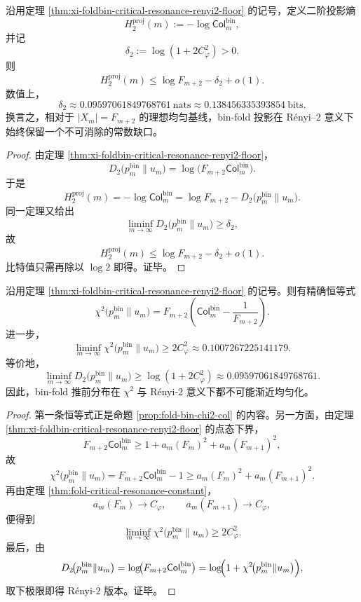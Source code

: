 \begin{theorem}\label{thm:xi-foldbin-renyi2-projection-entropy-constant-gap}
沿用定理 \ref{thm:xi-foldbin-critical-resonance-renyi2-floor} 的记号，定义二阶投影熵
\[
H_2^{\mathrm{proj}}(m):=-\log \mathsf{Col}^{\mathrm{bin}}_m,
\]
并记
\[
\delta_2:=\log(1+2C_\varphi^2)>0.
\]
则
\[
H_2^{\mathrm{proj}}(m)
\le
\log F_{m+2}-\delta_2+o(1).
\]
数值上，
\[
\delta_2\approx 0.09597061849768761\ \text{nats}
\approx 0.138456335393854\ \text{bits}.
\]
换言之，相对于 \(|X_m|=F_{m+2}\) 的理想均匀基线，bin-fold 投影在 Rényi--\(2\) 意义下始终保留一个不可消除的常数缺口。
\end{theorem}
\begin{proof}
由定理 \ref{thm:xi-foldbin-critical-resonance-renyi2-floor}，
\[
D_2\!\bigl(p_m^{\mathrm{bin}}\|u_m\bigr)
=
\log\!\bigl(F_{m+2}\mathsf{Col}^{\mathrm{bin}}_m\bigr).
\]
于是
\[
H_2^{\mathrm{proj}}(m)
=-\log \mathsf{Col}^{\mathrm{bin}}_m
=
\log F_{m+2}
-D_2\!\bigl(p_m^{\mathrm{bin}}\|u_m\bigr).
\]
同一定理又给出
\[
\liminf_{m\to\infty}D_2\!\bigl(p_m^{\mathrm{bin}}\|u_m\bigr)\ge \delta_2,
\]
故
\[
H_2^{\mathrm{proj}}(m)\le \log F_{m+2}-\delta_2+o(1).
\]
比特值只需再除以 \(\log 2\) 即得。证毕。
\end{proof}

\begin{theorem}\label{thm:xi-foldbin-critical-resonance-chi2-renyi2-separation}
沿用定理 \ref{thm:xi-foldbin-critical-resonance-renyi2-floor} 的记号。则有精确恒等式
\[
\boxed{\;
\chi^2\!\bigl(p_m^{\mathrm{bin}}\|u_m\bigr)
=
F_{m+2}\left(\mathsf{Col}^{\mathrm{bin}}_m-\frac{1}{F_{m+2}}\right).\;}
\]
进一步，
\[
\boxed{\;
\liminf_{m\to\infty}\chi^2\!\bigl(p_m^{\mathrm{bin}}\|u_m\bigr)
\ge
2C_\varphi^2
\approx 0.1007267225141179.\;}
\]
等价地，
\[
\boxed{\;
\liminf_{m\to\infty}D_2\!\bigl(p_m^{\mathrm{bin}}\|u_m\bigr)
\ge
\log(1+2C_\varphi^2)
\approx 0.09597061849768761.\;}
\]
因此，bin-fold 推前分布在 \(\chi^2\) 与 Rényi-\(2\) 意义下都不可能渐近均匀化。
\end{theorem}
\begin{proof}
第一条恒等式正是命题 \ref{prop:fold-bin-chi2-col} 的内容。另一方面，由定理 \ref{thm:xi-foldbin-critical-resonance-renyi2-floor} 的点态下界，
\[
F_{m+2}\mathsf{Col}^{\mathrm{bin}}_m
\ge
1+a_m(F_m)^2+a_m(F_{m+1})^2,
\]
故
\[
\chi^2\!\bigl(p_m^{\mathrm{bin}}\|u_m\bigr)
=
F_{m+2}\mathsf{Col}^{\mathrm{bin}}_m-1
\ge
a_m(F_m)^2+a_m(F_{m+1})^2.
\]
再由定理 \ref{thm:fold-critical-resonance-constant}，
\[
a_m(F_m)\to C_\varphi,
\qquad
a_m(F_{m+1})\to C_\varphi,
\]
便得到
\[
\liminf_{m\to\infty}\chi^2\!\bigl(p_m^{\mathrm{bin}}\|u_m\bigr)\ge 2C_\varphi^2.
\]
最后，由
\[
D_2\!\bigl(p_m^{\mathrm{bin}}\|u_m\bigr)
=
\log\!\bigl(F_{m+2}\mathsf{Col}^{\mathrm{bin}}_m\bigr)
=
\log\!\Bigl(1+\chi^2\!\bigl(p_m^{\mathrm{bin}}\|u_m\bigr)\Bigr),
\]
取下极限即得 Rényi-\(2\) 版本。证毕。
\end{proof}

